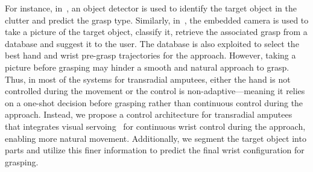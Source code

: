 For instance, in~\cite{shi2022target}, an object detector is used to identify the target object in the clutter and predict the grasp type. Similarly, in~\cite{starke2022}, the embedded camera is used to take a picture of the target object, classify it, retrieve the associated grasp from a database and suggest it to the user. The database is also exploited to select the best hand and wrist pre-grasp trajectories for the approach. However, taking a picture before grasping may hinder a smooth and natural approach to grasp. Thus, in most of the systems for transradial amputees, either the hand is not controlled during the movement or the control is non-adaptive—meaning it relies on a one-shot decision before grasping rather than continuous control during the approach. 
Instead, we propose a control architecture for transradial amputees that integrates visual servoing~\cite{chaumette2006} for continuous wrist control during the approach, enabling more natural movement. Additionally, we segment the target object into parts and utilize this finer information to predict the final wrist configuration for grasping.

